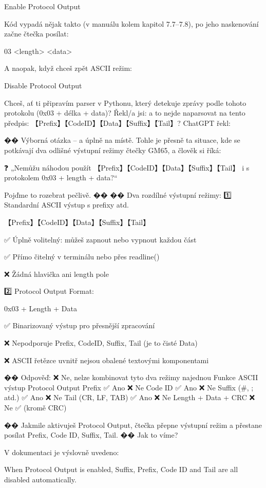 Enable Protocol Output

Kód vypadá nějak takto (v manuálu kolem kapitol 7.7–7.8), po jeho naskenování začne čtečka posílat:

03 <length> <data>

A naopak, když chceš zpět ASCII režim:

Disable Protocol Output

Chceš, ať ti připravím parser v Pythonu, který detekuje zprávy podle tohoto protokolu (0x03 + délka + data)?
Řekl/a jsi:
a to nejde naparsovat na tento předpis: 【Prefix】【CodeID】【Data】【Suffix】【Tail】?
ChatGPT řekl:

�� Výborná otázka – a úplně na místě. Tohle je přesně ta situace, kde se potkávají dva odlišné výstupní režimy čtečky GM65, a člověk si říká:

    ❓ „Nemůžu náhodou použít 【Prefix】【CodeID】【Data】【Suffix】【Tail】 i s protokolem 0x03 + length + data?“

Pojďme to rozebrat pečlivě. ��
�� Dva rozdílné výstupní režimy:
1️⃣ Standardní ASCII výstup s prefixy atd.

【Prefix】【CodeID】【Data】【Suffix】【Tail】

    ✅ Úplně volitelný: můžeš zapnout nebo vypnout každou část

    ✅ Přímo čitelný v terminálu nebo přes readline()

    ❌ Žádná hlavička ani length pole

2️⃣ Protocol Output Format:

0x03 + Length + Data

    ✅ Binarizovaný výstup pro přesnější zpracování

    ❌ Nepodporuje Prefix, CodeID, Suffix, Tail (je to čisté Data)

    ❌ ASCII řetězce uvnitř nejsou obalené textovými komponentami

�� Odpověď: ❌ Ne, nelze kombinovat tyto dva režimy najednou
Funkce	ASCII výstup	Protocol Output
Prefix	✅ Ano	❌ Ne
Code ID	✅ Ano	❌ Ne
Suffix (#, ; atd.)	✅ Ano	❌ Ne
Tail (CR, LF, TAB)	✅ Ano	❌ Ne
Length + Data + CRC	❌ Ne	✅ (kromě CRC)

�� Jakmile aktivuješ Protocol Output, čtečka přepne výstupní režim a přestane posílat Prefix, Code ID, Suffix, Tail.
�� Jak to víme?

    V dokumentaci je výslovně uvedeno:

When Protocol Output is enabled, Suffix, Prefix, Code ID and Tail are all disabled automatically.

